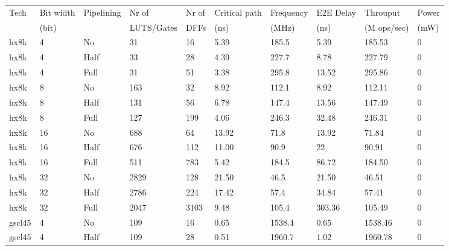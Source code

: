 \documentclass[11pt,landscape]{article}
\begin{document}
\begin{tabular}{llllllllll}
\hline
\hline
 Tech   & Bit width & Pipelining & Nr of      & Nr of & Critical path & Frequency & E2E Delay & Throuput    & Power \\
        & (bit)     &            & LUTS/Gates & DFFs  & (ns)          & (MHz)     & (ns)      & (M ops/sec) & (mW)  \\
 hx8k   & 4         & No         & 31         & 16    & 5.39          & 185.5     & 5.39      & 185.53      & 0     \\
 hx8k   & 4         & Half       & 33         & 28    & 4.39          & 227.7     & 8.78      & 227.79      & 0     \\
 hx8k   & 4         & Full       & 31         & 51    & 3.38          & 295.8     & 13.52     & 295.86      & 0     \\
 hx8k   & 8         & No         & 163        & 32    & 8.92          & 112.1     & 8.92      & 112.11      & 0     \\
 hx8k   & 8         & Half       & 131        & 56    & 6.78          & 147.4     & 13.56     & 147.49      & 0     \\
 hx8k   & 8         & Full       & 127        & 199   & 4.06          & 246.3     & 32.48     & 246.31      & 0     \\
 hx8k   & 16        & No         & 688        & 64    & 13.92         & 71.8      & 13.92     & 71.84       & 0     \\
 hx8k   & 16        & Half       & 676        & 112   & 11.00         & 90.9      & 22        & 90.91       & 0     \\
 hx8k   & 16        & Full       & 511        & 783   & 5.42          & 184.5     & 86.72     & 184.50      & 0     \\
 hx8k   & 32        & No         & 2829       & 128   & 21.50         & 46.5      & 21.50     & 46.51       & 0     \\
 hx8k   & 32        & Half       & 2786       & 224   & 17.42         & 57.4      & 34.84     & 57.41       & 0     \\
 hx8k   & 32        & Full       & 2047       & 3103  & 9.48          & 105.4     & 303.36    & 105.49      & 0     \\
 gscl45 & 4         & No         & 109        & 16    & 0.65          & 1538.4    & 0.65      & 1538.46     & 0     \\
 gscl45 & 4         & Half       & 109        & 28    & 0.51          & 1960.7    & 1.02      & 1960.78     & 0     \\

\end{tabular}
\end{document}
